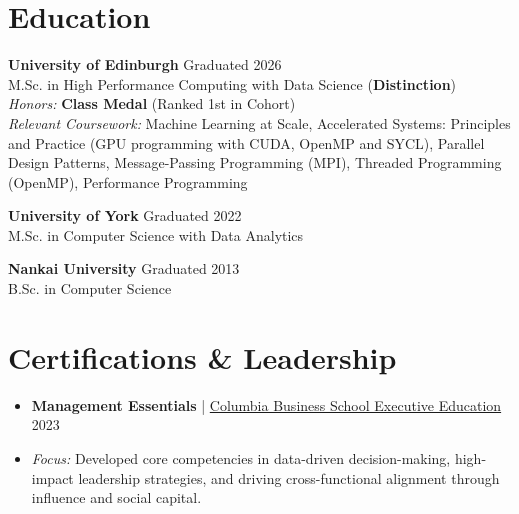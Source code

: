 \documentclass[10pt,a4paper]{article}
\begin{document}
\section{Education}

\textbf{University of Edinburgh} \hfill Graduated 2026 \\
M.Sc. in High Performance Computing with Data Science (\textbf{Distinction}) \\
\textit{Honors:} \textbf{Class Medal} (Ranked 1st in Cohort) \\
\textit{Relevant Coursework:} Machine Learning at Scale, Accelerated Systems: Principles and Practice (GPU programming with CUDA, OpenMP and SYCL), Parallel Design Patterns, Message-Passing Programming (MPI), Threaded Programming (OpenMP), Performance Programming

\vspace{2pt}
\textbf{University of York} \hfill Graduated 2022 \\
M.Sc. in Computer Science with Data Analytics

\vspace{2pt}
\textbf{Nankai University} \hfill Graduated 2013 \\
B.Sc. in Computer Science

\section{Certifications \& Leadership}
\begin{itemize}[noitemsep, leftmargin=*]
    \item \textbf{Management Essentials} | \href{https://certificates.emeritus.org/832a9cd2-8d9a-438c-9005-d1f2d6e17ca4#acc.ULclBnxK}{Columbia Business School Executive Education} \hfill 2023
    \item \textit{Focus:} Developed core competencies in data-driven decision-making, high-impact leadership strategies, and driving cross-functional alignment through influence and social capital.
\end{itemize}
\end{document}
